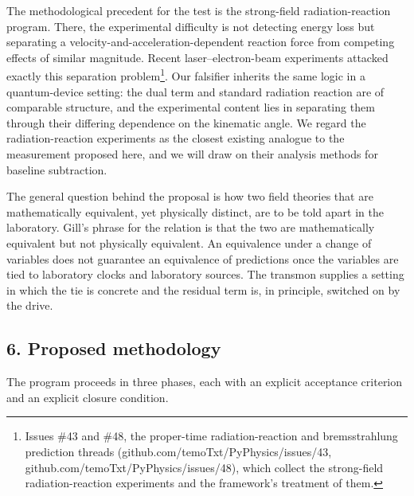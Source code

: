 \documentclass[
  11pt,
]{article}
\begin{document}
The methodological precedent for the test is the strong-field
radiation-reaction program. There, the experimental difficulty is not
detecting energy loss but separating a
velocity-and-acceleration-dependent reaction force from competing
effects of similar magnitude. Recent laser--electron-beam experiments
attacked exactly this separation problem\footnote{Issues \#43 and \#48,
  the proper-time radiation-reaction and bremsstrahlung prediction
  threads (github.com/temoTxt/PyPhysics/issues/43,
  github.com/temoTxt/PyPhysics/issues/48), which collect the
  strong-field radiation-reaction experiments and the framework's
  treatment of them.}. Our falsifier inherits the same logic in a
quantum-device setting: the dual term and standard radiation reaction
are of comparable structure, and the experimental content lies in
separating them through their differing dependence on the kinematic
angle. We regard the radiation-reaction experiments as the closest
existing analogue to the measurement proposed here, and we will draw on
their analysis methods for baseline subtraction.

The general question behind the proposal is how two field theories that
are mathematically equivalent, yet physically distinct, are to be told
apart in the laboratory. Gill's phrase for the relation is that the two
are mathematically equivalent but not physically equivalent. An
equivalence under a change of variables does not guarantee an
equivalence of predictions once the variables are tied to laboratory
clocks and laboratory sources. The transmon supplies a setting in which
the tie is concrete and the residual term is, in principle, switched on
by the drive.

\hypertarget{proposed-methodology}{%
\subsection{6. Proposed methodology}\label{proposed-methodology}}

The program proceeds in three phases, each with an explicit acceptance
criterion and an explicit closure condition.
\end{document}
